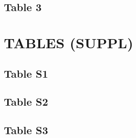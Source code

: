 \documentclass[
]{article}
\begin{document}
\clearpage

\hypertarget{table-3}{%
\subsection{Table 3}\label{table-3}}

\clearpage

\hypertarget{tables-suppl}{%
\section{TABLES (SUPPL)}\label{tables-suppl}}

\hypertarget{table-s1}{%
\subsection{Table S1}\label{table-s1}}

\clearpage

\hypertarget{table-s2}{%
\subsection{Table S2}\label{table-s2}}

\clearpage

\hypertarget{table-s3}{%
\subsection{Table S3}\label{table-s3}}

\clearpage
\end{document}
